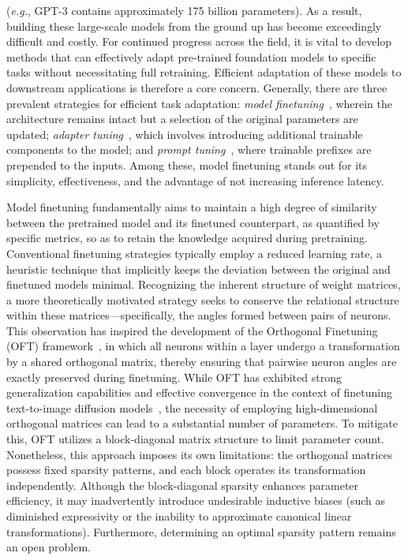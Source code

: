 (\emph{e.g.}, GPT-3 contains approximately 175 billion parameters). As a result, building these large-scale models from the ground up has become exceedingly difficult and costly. For continued progress across the field, it is vital to develop methods that can effectively adapt pre-trained foundation models to specific tasks without necessitating full retraining. Efficient adaptation of these models to downstream applications is therefore a core concern. Generally, there are three prevalent strategies for efficient task adaptation: \emph{model finetuning}~\cite{hulora2022,zaken2022bitfit,guo2020parameter,raffel2020exploring,qiu2023controlling,zhang2022adaptive,chavan2023one}, wherein the architecture remains intact but a selection of the original parameters are updated; \emph{adapter tuning}~\cite{rebuffi2017learning,houlsby2019parameter,pfeiffer2020adapterfusion,lin2020exploring,he2021towards}, which involves introducing additional trainable components to the model; and \emph{prompt tuning}~\cite{li2021prefix,lester2021power}, where trainable prefixes are prepended to the inputs. Among these, model finetuning stands out for its simplicity, effectiveness, and the advantage of not increasing inference latency.

Model finetuning fundamentally aims to maintain a high degree of similarity between the pretrained model and its finetuned counterpart, as quantified by specific metrics, so as to retain the knowledge acquired during pretraining. Conventional finetuning strategies typically employ a reduced learning rate, a heuristic technique that implicitly keeps the deviation between the original and finetuned models minimal. Recognizing the inherent structure of weight matrices, a more theoretically motivated strategy seeks to conserve the relational structure within these matrices—specifically, the angles formed between pairs of neurons. This observation has inspired the development of the Orthogonal Finetuning (OFT) framework~\cite{qiu2023controlling}, in which all neurons within a layer undergo a transformation by a shared orthogonal matrix, thereby ensuring that pairwise neuron angles are exactly preserved during finetuning. While OFT has exhibited strong generalization capabilities and effective convergence in the context of finetuning text-to-image diffusion models~\cite{qiu2023controlling}, the necessity of employing high-dimensional orthogonal matrices can lead to a substantial number of parameters. To mitigate this, OFT utilizes a block-diagonal matrix structure to limit parameter count. Nonetheless, this approach imposes its own limitations: the orthogonal matrices possess fixed sparsity patterns, and each block operates its transformation independently. Although the block-diagonal sparsity enhances parameter efficiency, it may inadvertently introduce undesirable inductive biases (such as diminished expressivity or the inability to approximate canonical linear transformations). Furthermore, determining an optimal sparsity pattern remains an open problem.

